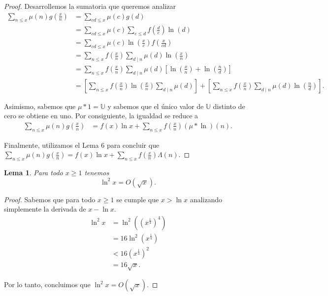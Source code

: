 \documentclass{article}
\newtheorem{lemma}[theorem]{Lema}
\theoremstyle{definition}
\theoremstyle{remark}
\begin{document}
\begin{proof}
Desarrollemos la sumatoria que queremos analizar
\begin{align*}
\sum_{n \leq x} \mu(n) g\left(\frac{x}{n}\right) &= \sum_{cd \leq x} \mu(c)g(d) \\
&= \sum_{cd \leq x} \mu(c) \sum_{e \leq d} f\left(\frac{d}{e}\right) \ln(d) \\
&= \sum_{cd \leq x} \mu(c) \ln\left(\frac{x}{c}\right) f \left(\frac{x}{cd}\right) \\
&= \sum_{n \leq x} f\left(\frac{x}{n}\right) \sum_{d \mid n} \mu(d) \ln\left(\frac{x}{n}\right) \\
&= \sum_{n \leq x} f\left(\frac{x}{n}\right) \sum_{d \mid n} \mu(d) \left[\ln \left(\frac{x}{n}\right) + \ln\left(\frac{n}{d}\right)\right] \\
&= \left[\sum_{n \leq x} f\left(\frac{x}{n}\right) \ln\left(\frac{x}{n}\right) \sum_{d \mid n} \mu(d)\right]
+  \left[\sum_{n \leq x} f\left(\frac{x}{n}\right) \sum_{d \mid n} \mu(d) \ln\left(\frac{n}{d}\right)\right].
\end{align*}

Asimismo, sabemos que $\mu * 1 = \mathbb{U}$ y
sabemos que el \'unico valor de $\mathbb{U}$ distinto de cero se obtiene en uno.
Por consiguiente, la igualdad se reduce a
\begin{align*}
\sum_{n \leq x} \mu(n)g\left(\frac{x}{n}\right) &= f(x)\ln x + \sum_{n \leq x} f\left(\frac{x}{n}\right) (\mu * \ln)(n).
\end{align*}

Finalmente, utilizamos el Lema $6$ para concluir que $\sum_{n \leq x} \mu(n)g\left(\frac{x}{n}\right) = f(x)\ln x + \sum_{n \leq x} f\left(\frac{x}{n}\right)\Lambda(n)$.
\end{proof}

\begin{lemma}
Para todo $x \geq 1$ tenemos
$$\ln^2 x = O(\sqrt{x}).$$
\end{lemma}

\begin{proof}
Sabemos que para todo $x \geq 1$ se cumple que $x > \ln x$ analizando simplemente la derivada de $x - \ln x$.
\begin{align*}
\ln^2 x &= \ln^2 ((x ^ {\frac{1}{4}}) ^ 4) \\
&= 16 \ln^2 (x ^ {\frac{1}{4}}) \\
&< 16 (x ^ {\frac{1}{4}}) ^ 2 \\
&= 16 \sqrt{x}.
\end{align*}

Por lo tanto, concluimos que $\ln^2 x = O(\sqrt{x})$.
\end{proof}
\end{document}
